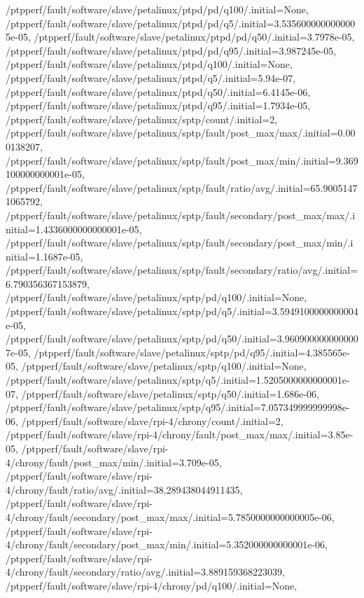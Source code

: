 {    /ptpperf/fault/software/slave/petalinux/ptpd/pd/q100/.initial=None,
    /ptpperf/fault/software/slave/petalinux/ptpd/pd/q5/.initial=3.5356000000000005e-05,
    /ptpperf/fault/software/slave/petalinux/ptpd/pd/q50/.initial=3.7978e-05,
    /ptpperf/fault/software/slave/petalinux/ptpd/pd/q95/.initial=3.987245e-05,
    /ptpperf/fault/software/slave/petalinux/ptpd/q100/.initial=None,
    /ptpperf/fault/software/slave/petalinux/ptpd/q5/.initial=5.94e-07,
    /ptpperf/fault/software/slave/petalinux/ptpd/q50/.initial=6.4145e-06,
    /ptpperf/fault/software/slave/petalinux/ptpd/q95/.initial=1.7934e-05,
    /ptpperf/fault/software/slave/petalinux/sptp/count/.initial=2,
    /ptpperf/fault/software/slave/petalinux/sptp/fault/post_max/max/.initial=0.000138207,
    /ptpperf/fault/software/slave/petalinux/sptp/fault/post_max/min/.initial=9.369100000000001e-05,
    /ptpperf/fault/software/slave/petalinux/sptp/fault/ratio/avg/.initial=65.90051471065792,
    /ptpperf/fault/software/slave/petalinux/sptp/fault/secondary/post_max/max/.initial=1.4336000000000001e-05,
    /ptpperf/fault/software/slave/petalinux/sptp/fault/secondary/post_max/min/.initial=1.1687e-05,
    /ptpperf/fault/software/slave/petalinux/sptp/fault/secondary/ratio/avg/.initial=6.790356367153879,
    /ptpperf/fault/software/slave/petalinux/sptp/pd/q100/.initial=None,
    /ptpperf/fault/software/slave/petalinux/sptp/pd/q5/.initial=3.5949100000000004e-05,
    /ptpperf/fault/software/slave/petalinux/sptp/pd/q50/.initial=3.9609000000000007e-05,
    /ptpperf/fault/software/slave/petalinux/sptp/pd/q95/.initial=4.385565e-05,
    /ptpperf/fault/software/slave/petalinux/sptp/q100/.initial=None,
    /ptpperf/fault/software/slave/petalinux/sptp/q5/.initial=1.5205000000000001e-07,
    /ptpperf/fault/software/slave/petalinux/sptp/q50/.initial=1.686e-06,
    /ptpperf/fault/software/slave/petalinux/sptp/q95/.initial=7.057349999999998e-06,
    /ptpperf/fault/software/slave/rpi-4/chrony/count/.initial=2,
    /ptpperf/fault/software/slave/rpi-4/chrony/fault/post_max/max/.initial=3.85e-05,
    /ptpperf/fault/software/slave/rpi-4/chrony/fault/post_max/min/.initial=3.709e-05,
    /ptpperf/fault/software/slave/rpi-4/chrony/fault/ratio/avg/.initial=38.289438044911435,
    /ptpperf/fault/software/slave/rpi-4/chrony/fault/secondary/post_max/max/.initial=5.7850000000000005e-06,
    /ptpperf/fault/software/slave/rpi-4/chrony/fault/secondary/post_max/min/.initial=5.352000000000001e-06,
    /ptpperf/fault/software/slave/rpi-4/chrony/fault/secondary/ratio/avg/.initial=3.889159368223039,
    /ptpperf/fault/software/slave/rpi-4/chrony/pd/q100/.initial=None,
}
